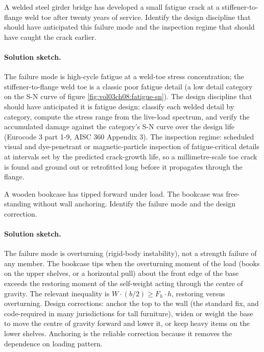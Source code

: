 \begin{exercise}
A welded steel girder bridge has developed a small fatigue crack at
a stiffener-to-flange weld toe after twenty years of service.
Identify the design discipline that should have anticipated this
failure mode and the inspection regime that should have caught the
crack earlier.

\paragraph{Solution sketch.} The failure mode is high-cycle fatigue at
a weld-toe stress concentration; the stiffener-to-flange weld toe is a
classic poor fatigue detail (a low detail category on the S-N curve of
figure \ref{fig:vol03ch08:fatigue-sn}). The design discipline that
should have anticipated it is fatigue design: classify each welded
detail by category, compute the stress range from the live-load
spectrum, and verify the accumulated damage against the category's S-N
curve over the design life (Eurocode 3 part 1-9, AISC 360 Appendix 3).
The inspection regime: scheduled visual and dye-penetrant or
magnetic-particle inspection of fatigue-critical details at intervals
set by the predicted crack-growth life, so a millimetre-scale toe crack
is found and ground out or retrofitted long before it propagates
through the flange.
\end{exercise}

\begin{exercise}
A wooden bookcase has tipped forward under load. The bookcase was
free-standing without wall anchoring. Identify the failure mode and
the design correction.

\paragraph{Solution sketch.} The failure mode is overturning
(rigid-body instability), not a strength failure of any member. The
bookcase tips when the overturning moment of the load (books on the
upper shelves, or a horizontal pull) about the front edge of the base
exceeds the restoring moment of the self-weight acting through the
centre of gravity. The relevant inequality is $W\cdot(b/2) \geq
F_h\cdot h$, restoring versus overturning. Design corrections: anchor
the top to the wall (the standard fix, and code-required in many
jurisdictions for tall furniture), widen or weight the base to move the
centre of gravity forward and lower it, or keep heavy items on the
lower shelves. Anchoring is the reliable correction because it removes
the dependence on loading pattern.
\end{exercise}

